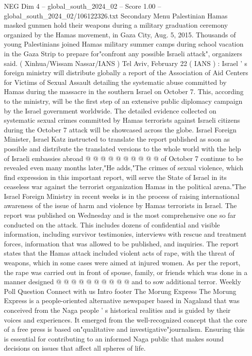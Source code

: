 \begin{textsample}{NEG Dim 4 – global\_south\_2024\_02 – Score 1.00 – global\_south\_2024\_02/106122326.txt}  \label{ex:f4_neg_390}
Secondary Menu Palestinian Hamas masked gunmen hold their weapons during a military graduation ceremony organized by the Hamas movement, in Gaza City, Aug. 5, 2015.
Thousands of young Palestinians joined Hamas military summer camps during school vacation in the Gaza Strip to prepare for"confront any possible Israeli attack", organizers said. ( Xinhua/Wissam Nassar/IANS ) Tel Aviv, February 22 ( IANS ) : Israel ' s foreign ministry will distribute globally a report of the Association of Aid Centers for Victims of Sexual Assault detailing the systematic abuse committed by Hamas during the massacre in the southern Israel on October 7.
This, according to the ministry, will be the first step of an extensive public diplomacy campaign by the Israel government worldwide.
The detailed evidence collected on systematic sexual crimes committed by Hamas terrorists against Israeli citizens during the October 7 attack will be showcased across the globe.
Israel Foreign Minister, Israel Katz instructed to translate the report published as soon as possible and distribute the translated versions to the whole world with the help of Israeli embassies abroad @ @ @ @ @ @ @ @ @ @ of October 7 continue to be revealed even many months later,"He adds,"The crimes of sexual violence, which find expression in this important report, will serve the State of Israel in its ceaseless war against the terrorist organization Hamas in the political arena."The Israel Foreign Ministry in recent weeks is in the process of raising international awareness of the issue of harm and violence by Hamas terrorists in Israel.
The report was published on Wednesday and is the most comprehensive one so far conducted on the attack.
This includes dozens of confidential and visible information, including survivor testimonies, interviews with rescue and treatment forces, information that was allowed to be published, and inquiries.
The report states that the Hamas attack included violent acts of rape, with the threat of weapons, which in some cases were aimed at injured women.
As per the report, the rape was carried out in front of spouse, family, or friends which was done in a manner designed @ @ @ @ @ @ @ @ @ @ and to sow additional terror.
Weekly Poll Question Connect with us Intro footer The Morung Express The Morung Express is a people-oriented alternative newspaper based in Nagaland that was conceived from the Naga people ' s historical realities and is guided by their voices and experiences.
It emerged from the well-recognized concept that the core of a free press is based on"qualitative and investigative"journalism.
Ensuring this is essential for contributing to an informed Naga public that makes sound decisions on issues that affect all spheres of life.

\end{textsample}
